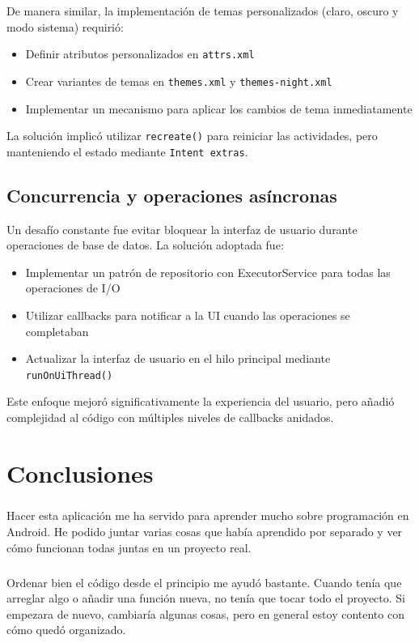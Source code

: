 \documentclass[a4paper,12pt]{report}
\begin{document}
      De manera similar, la implementación de temas personalizados (claro, oscuro y modo sistema) requirió\cite{androidUIUX}:
      \begin{itemize}
          \item Definir atributos personalizados en \texttt{attrs.xml}
          \item Crear variantes de temas en \texttt{themes.xml} y \texttt{themes-night.xml}
          \item Implementar un mecanismo para aplicar los cambios de tema inmediatamente
      \end{itemize}
      
      La solución implicó utilizar \texttt{recreate()} para reiniciar las actividades, pero manteniendo el estado mediante \texttt{Intent extras}.
      
    \section{Concurrencia y operaciones asíncronas}
      Un desafío constante fue evitar bloquear la interfaz de usuario durante operaciones de base de datos. La solución adoptada fue\cite{android_best_practices}:
      \begin{itemize}
          \item Implementar un patrón de repositorio con ExecutorService para todas las operaciones de I/O
          \item Utilizar callbacks para notificar a la UI cuando las operaciones se completaban
          \item Actualizar la interfaz de usuario en el hilo principal mediante \texttt{runOnUiThread()}
      \end{itemize}

      Este enfoque mejoró significativamente la experiencia del usuario, pero añadió complejidad al código con múltiples niveles de callbacks anidados.
  \chapter{Conclusiones}
    \paragraph*{}{Hacer esta aplicación me ha servido para aprender mucho sobre programación en Android. He podido juntar varias cosas que había aprendido por separado y ver cómo funcionan todas juntas en un proyecto real\cite{android_programming}.}
    \paragraph*{}{Ordenar bien el código desde el principio me ayudó bastante\cite{effective_java}. Cuando tenía que arreglar algo o añadir una función nueva, no tenía que tocar todo el proyecto. Si empezara de nuevo, cambiaría algunas cosas, pero en general estoy contento con cómo quedó organizado.}
\end{document}
